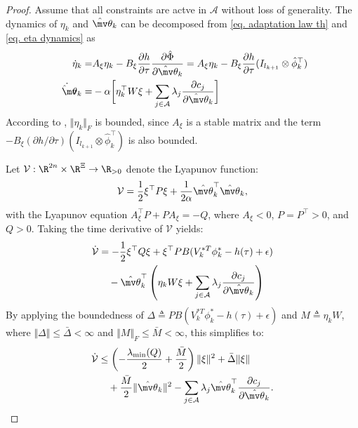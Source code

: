\documentclass[lettersize,journal]{IEEEtran}
\newcommand*{\wth}{\mv\theta}
\begin{document}
\begin{proof}
Assume that all constraints are actve in $\mathcal A$ without loss of generality. The dynamics of $\eta_k$ and $\hat\wth_k$ can be decomposed from \eqref{eq. adaptation law th} and \eqref{eq. eta dynamics} as 
\begin{equation}
    \begin{aligned}
        \dot\eta_k =
        & 
        A_\xi \eta_k -B_\xi {\partial h\over\partial\tau}{\partial \hat\Phi\over \partial \hat\wth_k}
        =
        A_\xi \eta_k -B_\xi {\partial h\over\partial\tau}(I_{l_{k+1}}\otimes \hat\phi_k^\top)\\
        \dot{\hat\wth}_k =
        & -\alpha 
        \bigg[
            \eta_k^\top W\xi+
            \sum_{j\in\mathcal{A}}
            \lambda_j{\partial c_j\over\partial \hat\wth_k}
        \bigg]
    \end{aligned} 
\end{equation}
According to \cite[Chap.~4 T.~1.9]{RN13}, $\Vert \eta_k\Vert_F$ is bounded, since $A_\xi$ is a stable matrix and the term $-B_\xi(\partial h/\partial \tau)(I_{l_{k+1}}\otimes\hat\phi_k^\top)$ is also bounded.

Let $\mathcal{V}: \R^{2n} \times \R^{\Xi} \to \R_{>0}$ denote the Lyapunov function:
\begin{equation}
    \mathcal{V} = \frac{1}{2} \xi^\top P \xi + \frac{1}{2 \alpha} \hat{\wth}_k^\top \hat{\wth}_k,
    \label{eq. Lyapunov func}
\end{equation}
with the Lyapunov equation $A_\xi^\top P + P A_\xi = -Q$, where $A_\xi < 0$, $P = P^\top > 0$, and $Q > 0$.
Taking the time derivative of $\mathcal{V}$ yields:
\begin{equation}
    \begin{aligned}
        \dot{\mathcal{V}} 
        &= -\frac{1}{2} \xi^\top Q \xi + \xi^\top P B (V_k^{*T} \phi_k^* - h(\tau) + \epsilon) \\
        &\quad - \hat{\wth}_k^\top \left( \eta_k W \xi + \sum_{j \in \mathcal{A}} \lambda_j \frac{\partial c_j}{\partial \hat{\wth}_k} \right)
    \end{aligned}
    \label{eq. Lyapunov dot}
\end{equation}
By applying the boundedness of $\Delta \triangleq P B (V_k^{*T} \phi_k^* - h(\tau) + \epsilon)$ and $M \triangleq \eta_k W$, where $\Vert \Delta \Vert \leq \bar{\Delta} < \infty$ and $\Vert M \Vert_F \leq \bar{M} < \infty$, this simplifies to:
\begin{equation}
    \begin{aligned}
        \dot{\mathcal{V}} 
        &\leq \left( -\frac{\lambda_{\text{min}}(Q)}{2} + \frac{\bar{M}}{2} \right) \Vert \xi \Vert^2 + \bar{\Delta} \Vert \xi \Vert \\
        &\quad + \frac{\bar{M}}{2} \Vert \hat{\wth}_k \Vert^2 - \sum_{j \in \mathcal{A}} \lambda_j \hat{\wth}_k^\top \frac{\partial c_j}{\partial \hat{\wth}_k}.
    \end{aligned}
    \label{eq. dot Vk 1}
\end{equation}


\end{proof}
\end{document}
